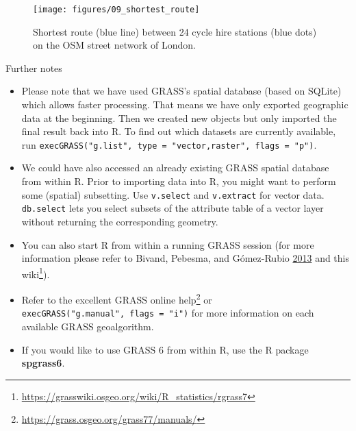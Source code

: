 \documentclass[]{krantz}
\newenvironment{Shaded}{\begin{snugshade}}{\end{snugshade}}
\newcommand{\DataTypeTok}[1]{\textcolor[rgb]{0.27,0.27,0.27}{#1}}
\newcommand{\DecValTok}[1]{\textcolor[rgb]{0.06,0.06,0.06}{#1}}
\newcommand{\KeywordTok}[1]{\textcolor[rgb]{0.27,0.27,0.27}{\textbf{#1}}}
\newcommand{\NormalTok}[1]{#1}
\newcommand{\OperatorTok}[1]{\textcolor[rgb]{0.43,0.43,0.43}{\textbf{#1}}}
\newcommand{\StringTok}[1]{\textcolor[rgb]{0.5,0.5,0.5}{#1}}
\providecommand{\tightlist}{%
  \setlength{\itemsep}{0pt}\setlength{\parskip}{0pt}}
\let\rmarkdownfootnote\footnote%
\def\footnote{\protect\rmarkdownfootnote}
\renewcommand{\href}[2]{#2\footnote{\url{#1}}}
\begin{document}
\begin{figure}[t]

{\centering \texttt{[image: figures/09\_shortest\_route]} 

}

\caption[Shortest route between 24 cycle hire stations.]{Shortest route (blue line) between 24 cycle hire stations (blue dots) on the OSM street network of London.}\label{fig:grass-mapview}
\end{figure}

\begin{Shaded}
\end{Shaded}

Further notes

\begin{itemize}
\tightlist
\item
  Please note that we have used GRASS's spatial database (based on SQLite) which allows faster processing.
  That means we have only exported geographic data at the beginning.
  Then we created new objects but only imported the final result back into R.
  To find out which datasets are currently available, run \texttt{execGRASS("g.list",\ type\ =\ "vector,raster",\ flags\ =\ "p")}.
\item
  We could have also accessed an already existing GRASS spatial database from within R.
  Prior to importing data into R, you might want to perform some (spatial) subsetting.
  Use \texttt{v.select} and \texttt{v.extract} for vector data.
  \texttt{db.select} lets you select subsets of the attribute table of a vector layer without returning the corresponding geometry.
\item
  You can also start R from within a running GRASS session (for more information please refer to Bivand, Pebesma, and Gómez-Rubio \protect\hyperlink{ref-bivand_applied_2013}{2013} and this \href{https://grasswiki.osgeo.org/wiki/R_statistics/rgrass7}{wiki}).
\item
  Refer to the excellent \href{https://grass.osgeo.org/grass77/manuals/}{GRASS online help} or \texttt{execGRASS("g.manual",\ flags\ =\ "i")} for more information on each available GRASS geoalgorithm.
\item
  If you would like to use GRASS 6 from within R, use the R package \textbf{spgrass6}.
\end{itemize}
\end{document}
